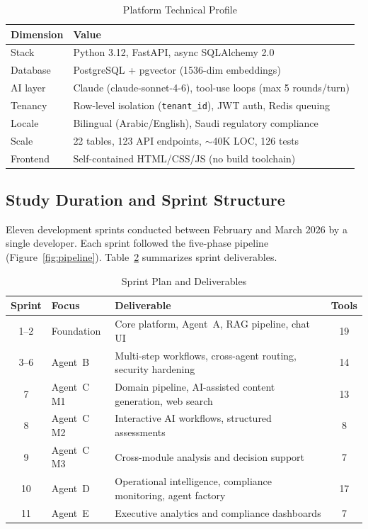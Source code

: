 \documentclass[11pt,a4paper]{article}
\begin{document}
\begin{table}[htbp]
\caption{Platform Technical Profile}
\label{tab:techprofile}
\centering
\footnotesize
\begin{tabular}{@{}ll@{}}
\toprule
\textbf{Dimension} & \textbf{Value} \\
\midrule
Stack & Python 3.12, FastAPI, async SQLAlchemy 2.0 \\
Database & PostgreSQL + pgvector (1536-dim embeddings) \\
AI layer & Claude (claude-sonnet-4-6), tool-use loops (max 5 rounds/turn) \\
Tenancy & Row-level isolation (\texttt{tenant\_id}), JWT auth, Redis queuing \\
Locale & Bilingual (Arabic/English), Saudi regulatory compliance \\
Scale & 22 tables, 123 API endpoints, $\sim$40K LOC, 126 tests \\
Frontend & Self-contained HTML/CSS/JS (no build toolchain) \\
\bottomrule
\end{tabular}
\end{table}

\subsection{Study Duration and Sprint Structure}

Eleven development sprints conducted between February and March 2026 by a single developer. Each sprint followed the five-phase pipeline (Figure~\ref{fig:pipeline}). Table~\ref{tab:sprintplan} summarizes sprint deliverables.

\begin{table}[htbp]
\caption{Sprint Plan and Deliverables}
\label{tab:sprintplan}
\centering
\footnotesize
\begin{tabular}{@{}clp{5cm}c@{}}
\toprule
\textbf{Sprint} & \textbf{Focus} & \textbf{Deliverable} & \textbf{Tools} \\
\midrule
1--2 & Foundation & Core platform, Agent~A, RAG pipeline, chat UI & 19 \\
3--6 & Agent~B & Multi-step workflows, cross-agent routing, security hardening & 14 \\
7 & Agent~C M1 & Domain pipeline, AI-assisted content generation, web search & 13 \\
8 & Agent~C M2 & Interactive AI workflows, structured assessments & 8 \\
9 & Agent~C M3 & Cross-module analysis and decision support & 7 \\
10 & Agent~D & Operational intelligence, compliance monitoring, agent factory & 17 \\
11 & Agent~E & Executive analytics and compliance dashboards & 7 \\
\bottomrule
\end{tabular}
\end{table}
\end{document}
